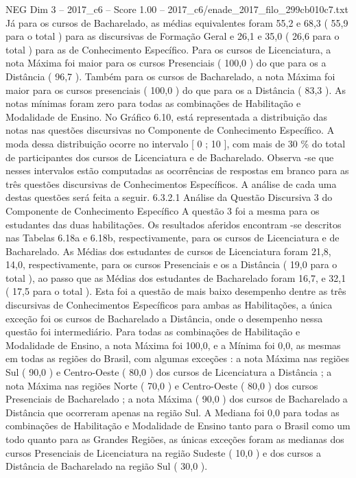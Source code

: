 \begin{textsample}{NEG Dim 3 – 2017\_c6 – Score 1.00 – 2017\_c6/enade\_2017\_filo\_299cb010c7.txt}
Já para os cursos de Bacharelado, as médias equivalentes foram 55,2 e 68,3 ( 55,9 para o total ) para as discursivas de Formação Geral e 26,1 e 35,0 ( 26,6 para o total ) para as de Conhecimento Específico.
Para os cursos de Licenciatura, a nota Máxima foi maior para os cursos Presenciais ( 100,0 ) do que para os a Distância ( 96,7 ).
Também para os cursos de Bacharelado, a nota Máxima foi maior para os cursos presenciais ( 100,0 ) do que para os a Distância ( 83,3 ).
As notas mínimas foram zero para todas as combinações de Habilitação e Modalidade de Ensino.
No Gráfico 6.10, está representada a distribuição das notas nas questões discursivas no Componente de Conhecimento Específico.
A moda dessa distribuição ocorre no intervalo [ 0 ; 10 ], com mais de 30 \% do total de participantes dos cursos de Licenciatura e de Bacharelado.
Observa -se que nesses intervalos estão computadas as ocorrências de respostas em branco para as três questões discursivas de Conhecimentos Específicos.
A análise de cada uma destas questões será feita a seguir. 6.3.2.1 Análise da Questão Discursiva 3 do Componente de Conhecimento Específico A questão 3 foi a mesma para os estudantes das duas habilitações.
Os resultados aferidos encontram -se descritos nas Tabelas 6.18a e 6.18b, respectivamente, para os cursos de Licenciatura e de Bacharelado.
As Médias dos estudantes de cursos de Licenciatura foram 21,8, 14,0, respectivamente, para os cursos Presenciais e os a Distância ( 19,0 para o total ), ao passo que as Médias dos estudantes de Bacharelado foram 16,7, e 32,1 ( 17,5 para o total ).
Esta foi a questão de mais baixo desempenho dentre as três discursivas de Conhecimentos Específicos para ambas as Habilitações, a única exceção foi os cursos de Bacharelado a Distância, onde o desempenho nessa questão foi intermediário.
Para todas as combinações de Habilitação e Modalidade de Ensino, a nota Máxima foi 100,0, e a Mínima foi 0,0, as mesmas em todas as regiões do Brasil, com algumas exceções : a nota Máxima nas regiões Sul ( 90,0 ) e Centro-Oeste ( 80,0 ) dos cursos de Licenciatura a Distância ; a nota Máxima nas regiões Norte ( 70,0 ) e Centro-Oeste ( 80,0 ) dos cursos Presenciais de Bacharelado ; a nota Máxima ( 90,0 ) dos cursos de Bacharelado a Distância que ocorreram apenas na região Sul.
A Mediana foi 0,0 para todas as combinações de Habilitação e Modalidade de Ensino tanto para o Brasil como um todo quanto para as Grandes Regiões, as únicas exceções foram as medianas dos cursos Presenciais de Licenciatura na região Sudeste ( 10,0 ) e dos cursos a Distância de Bacharelado na região Sul ( 30,0 ).

\end{textsample}
